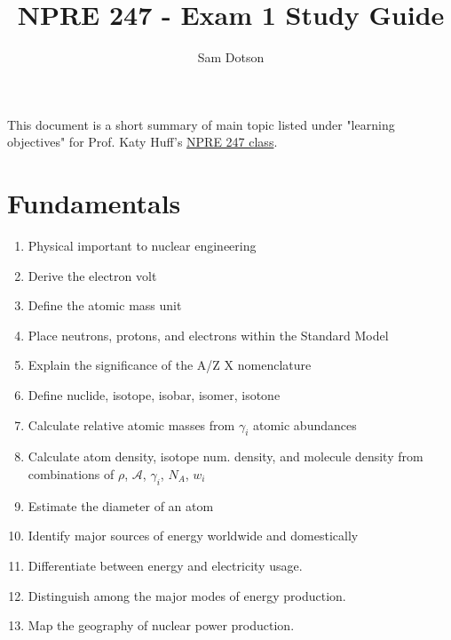 \documentclass{article}
\author{Sam Dotson}
\title{NPRE 247 - Exam 1 Study Guide}
\begin{document}
\maketitle

This document is a short summary of main topic listed under "learning objectives" for Prof. Katy Huff's 
\href{https://github.com/katyhuff/npre247}{NPRE 247 class}.

\section{Fundamentals}

\begin{enumerate}
	\item{Physical important to nuclear engineering}
	\item{Derive the electron volt}
	\item{Define the atomic mass unit}
	\item{Place neutrons, protons, and electrons within the Standard Model}
	\item{Explain the significance of the A/Z X nomenclature}
	\item{Define nuclide, isotope, isobar, isomer, isotone}
	\item{Calculate relative atomic masses from $\gamma_{i}$ atomic abundances}
	\item{Calculate atom density, isotope num. density, and molecule density from combinations of $\rho$, $\mathcal{A}$, $\gamma_{i}$, $N_{A}$, $w_{i}$}
	\item{Estimate the diameter of an atom}
	\item{Identify major sources of energy worldwide and domestically}
	\item{Differentiate between energy and electricity usage.}
	\item{Distinguish among the major modes of energy production.}
	\item{Map the geography of nuclear power production.}
\end{enumerate}
\end{document}
